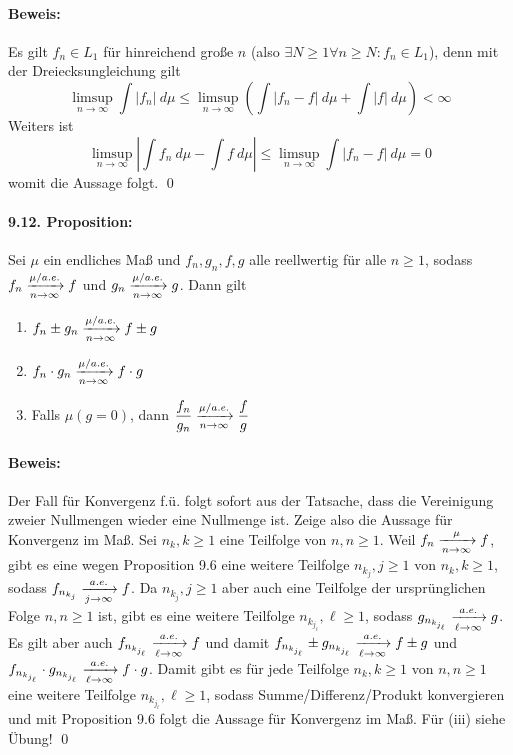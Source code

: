 \documentclass[11pt]{report}
\begin{document}
\paragraph{Beweis:}Es gilt $f_n\in L_1$ f\"ur hinreichend gro\ss{}e $n$ (also $\exists N\geq1\forall n\geq N:f_n\in L_1$), denn mit der Dreiecksungleichung gilt
$$\limsup_{n\to\infty}\int|f_n|\ d\mu\leq\limsup_{n\to\infty}\left(\int|f_n-f|\ d\mu+\int|f|\ d\mu\right)<\infty$$
Weiters ist 
$$\limsup_{n\to\infty}\left|\int f_n\ d\mu-\int f\ d\mu\right|\leq\limsup_{n\to\infty}\int|f_n-f|\ d\mu=0$$
womit die Aussage folgt. \qed

\paragraph{9.12. Proposition:}Sei $\mu$ ein endliches Ma\ss{} und $f_n,g_n,f,g$ alle reellwertig f\"ur alle $n\geq1$, sodass $f_n\nto{\mu/a.e.}{n\to\infty}f$ und $g_n\nto{\mu/a.e.}{n\to\infty}g$. Dann gilt
\begin{enumerate}[label=(\roman*)]
    \item $f_n\pm g_n\nto{\mu/a.e.}{n\to\infty}f\pm g$
    \item $f_n\cdot g_n\nto{\mu/a.e.}{n\to\infty}f\cdot g$
    \item Falls $\mu(g=0)$, dann $\dfrac{f_n}{g_n}\nto{\mu/a.e.}{n\to\infty}\dfrac{f}{g}$
\end{enumerate}

\paragraph{Beweis:} Der Fall f\"ur Konvergenz f.\"u. folgt sofort aus der Tatsache, dass die Vereinigung zweier Nullmengen wieder eine Nullmenge ist. Zeige also die Aussage f\"ur Konvergenz im Ma\ss{}.\newline\newline
Sei $n_k,k\geq1$ eine Teilfolge von $n,n\geq1$. Weil $f_n\nto{\mu}{n\to\infty}f$, gibt es eine wegen Proposition 9.6 eine weitere Teilfolge $n_{k_j},j\geq1$ von $n_k,k\geq1$, sodass $f_{n_{k_j}}\nto{a.e.}{j\to\infty}f$. Da $n_{k_j},j\geq1$ aber auch eine Teilfolge der urspr\"unglichen Folge $n,n\geq1$ ist, gibt es eine weitere Teilfolge $n_{k_{j_\ell}},\ell\geq1$, sodass $g_{n_{k_{j_\ell}}}\nto{a.e.}{\ell\to\infty}g$. Es gilt aber auch $f_{n_{k_{j_\ell}}}\nto{a.e.}{\ell\to\infty}f$ und damit $f_{n_{k_{j_\ell}}}\pm g_{n_{k_{j_\ell}}}\nto{a.e.}{\ell\to\infty}f\pm g$ und $f_{n_{k_{j_\ell}}}\cdot g_{n_{k_{j_\ell}}}\nto{a.e.}{\ell\to\infty}f\cdot g$. Damit gibt es f\"ur jede Teilfolge $n_k,k\geq1$ von $n,n\geq1$ eine weitere Teilfolge $n_{k_{j_\ell}},\ell\geq1$, sodass Summe/Differenz/Produkt konvergieren und mit Proposition 9.6 folgt die Aussage f\"ur Konvergenz im Ma\ss{}. F\"ur (iii) siehe \"Ubung! \qed
\end{document}
